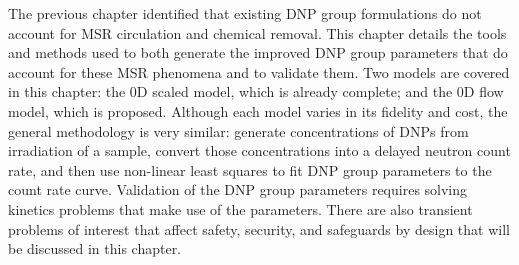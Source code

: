 The previous chapter identified that existing \gls{DNP} group formulations do not account for \gls{MSR} circulation and chemical removal.
This chapter details the tools and methods used to both generate the improved \gls{DNP} group parameters that do account for these \gls{MSR} phenomena and to validate them.
Two models are covered in this chapter: the 0D scaled model, which is already complete; and the 0D flow model, which is proposed.
Although each model varies in its fidelity and cost, the general methodology is very similar: generate concentrations of \glspl{DNP} from irradiation of a sample, convert those concentrations into a delayed neutron count rate, and then use non-linear least squares to fit \gls{DNP} group parameters to the count rate curve.
Validation of the \gls{DNP} group parameters requires solving kinetics problems that make use of the parameters.
There are also transient problems of interest that affect safety, security, and safeguards by design that will be discussed in this chapter.
